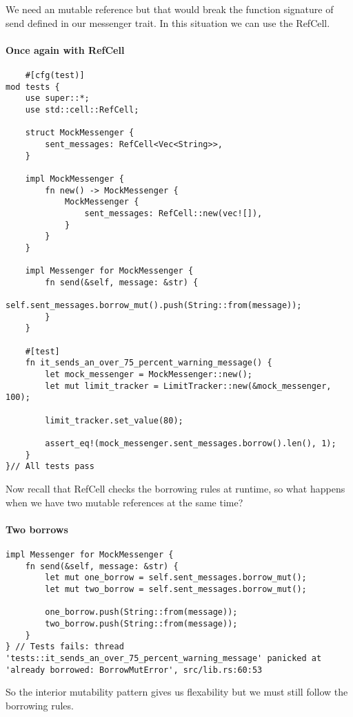 We need an mutable reference but that would break the function signature of send defined in our messenger trait. In this situation we can use the RefCell.
\newpage
\paragraph*{Once again with RefCell}\begin{lstlisting}
    #[cfg(test)]
mod tests {
    use super::*;
    use std::cell::RefCell;

    struct MockMessenger {
        sent_messages: RefCell<Vec<String>>,
    }

    impl MockMessenger {
        fn new() -> MockMessenger {
            MockMessenger {
                sent_messages: RefCell::new(vec![]),
            }
        }
    }

    impl Messenger for MockMessenger {
        fn send(&self, message: &str) {
            self.sent_messages.borrow_mut().push(String::from(message)); 
        }
    }

    #[test]
    fn it_sends_an_over_75_percent_warning_message() {
        let mock_messenger = MockMessenger::new();
        let mut limit_tracker = LimitTracker::new(&mock_messenger, 100);

        limit_tracker.set_value(80);

        assert_eq!(mock_messenger.sent_messages.borrow().len(), 1); 
    }
}// All tests pass
\end{lstlisting}


Now recall that RefCell checks the borrowing rules at runtime, so what happens when we have two mutable references at the same time?

\paragraph*{Two borrows}\begin{lstlisting}
impl Messenger for MockMessenger {
    fn send(&self, message: &str) {
        let mut one_borrow = self.sent_messages.borrow_mut();
        let mut two_borrow = self.sent_messages.borrow_mut();
            
        one_borrow.push(String::from(message));
        two_borrow.push(String::from(message));
    }
} // Tests fails: thread 'tests::it_sends_an_over_75_percent_warning_message' panicked at 'already borrowed: BorrowMutError', src/lib.rs:60:53
\end{lstlisting}

So the interior mutability pattern gives us flexability but we must still follow the borrowing rules.


